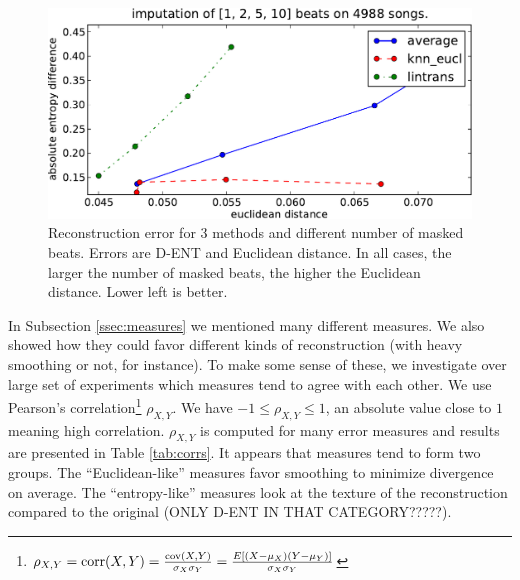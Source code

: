 \documentclass{article}
\begin{document}
\begin{figure}[t]
\begin{center}
\includegraphics[width=.9\columnwidth]{recon_score_in_2d_5k}
\end{center}
\caption{Reconstruction error for $3$ methods and different
number of masked beats. Errors are D-ENT and Euclidean
distance. In all cases, the larger the number of masked beats,
the higher the Euclidean distance. Lower left is better.
\label{fig:2dscore}}
\end{figure}

In Subsection \ref{ssec:measures} we mentioned many different measures.
We also showed how they could favor different kinds of reconstruction
(with heavy smoothing or not, for instance). To make some sense of
these, we investigate over large set of experiments which measures tend
to agree with each other. We use Pearson's 
correlation\footnote{
$\rho_{X,Y}=\mathrm{corr}(X,Y)={\mathrm{cov}(X,Y) \over \sigma_X \sigma_Y} ={E[(X-\mu_X)(Y-\mu_Y)] \over \sigma_X\sigma_Y}$
} $\rho_{X,Y}$. We have $-1 \leq \rho_{X,Y} \leq 1$, an absolute
value close to $1$ meaning high correlation.
$\rho_{X,Y}$ is computed for many error measures and results are presented in
Table \ref{tab:corrs}. It appears that measures tend to form two groups.
The ``Euclidean-like'' measures favor smoothing to minimize divergence on
average. The ``entropy-like'' measures look at the texture of the reconstruction
compared to the original (ONLY D-ENT IN THAT CATEGORY?????).
\end{document}
